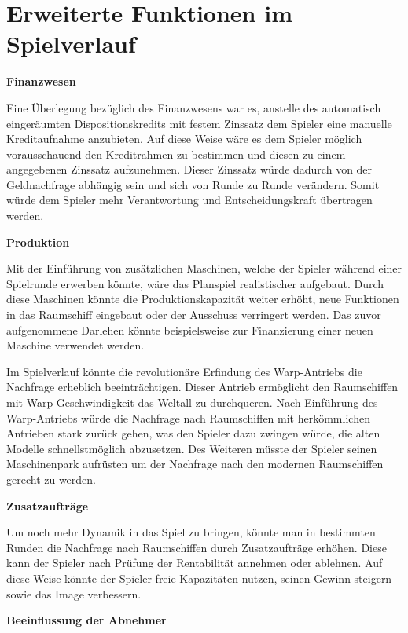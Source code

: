 \section{Erweiterte Funktionen im Spielverlauf}
\label{sec:fazit-spielverlauf}

\textbf{Finanzwesen}

Eine Überlegung bezüglich des Finanzwesens war es, anstelle des automatisch eingeräumten Dispositionskredits mit festem Zinssatz dem Spieler eine manuelle Kreditaufnahme anzubieten. Auf diese Weise wäre es dem Spieler möglich vorausschauend den Kreditrahmen zu bestimmen und diesen zu einem angegebenen Zinssatz aufzunehmen. Dieser Zinssatz würde dadurch von der Geldnachfrage abhängig sein und sich von Runde zu Runde verändern. Somit würde dem Spieler mehr Verantwortung und Entscheidungskraft übertragen werden. 

\medskip

\textbf{Produktion}

Mit der Einführung von zusätzlichen Maschinen, welche der Spieler während einer Spielrunde erwerben könnte, wäre das Planspiel realistischer aufgebaut. Durch diese Maschinen könnte die Produktionskapazität weiter erhöht, neue Funktionen in das Raumschiff eingebaut oder der Ausschuss verringert werden. Das zuvor aufgenommene Darlehen könnte beispielsweise zur Finanzierung einer neuen Maschine verwendet werden. 

Im Spielverlauf könnte die revolutionäre Erfindung des Warp-Antriebs die Nachfrage erheblich beeinträchtigen. Dieser Antrieb ermöglicht den Raumschiffen mit Warp-Geschwindigkeit das Weltall zu durchqueren. Nach Einführung des Warp-Antriebs würde die Nachfrage nach Raumschiffen mit herkömmlichen Antrieben stark zurück gehen, was den Spieler dazu zwingen würde, die alten Modelle schnellstmöglich abzusetzen. Des Weiteren müsste der Spieler seinen Maschinenpark aufrüsten um der Nachfrage nach den modernen Raumschiffen gerecht zu werden.

\medskip

\textbf{Zusatzaufträge}

Um noch mehr Dynamik in das Spiel zu bringen, könnte man in bestimmten Runden die Nachfrage nach Raumschiffen durch Zusatzaufträge erhöhen. Diese kann der Spieler nach Prüfung der Rentabilität annehmen oder ablehnen. Auf diese Weise könnte der Spieler freie Kapazitäten nutzen, seinen Gewinn steigern sowie das Image verbessern. 

\medskip

\textbf{Beeinflussung der Abnehmer}

